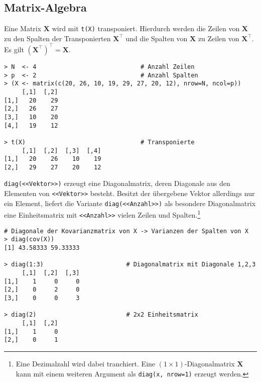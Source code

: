 \subsection{Matrix-Algebra}
\label{sec:matAlg}

Eine Matrix $\bm{X}$ wird mit \lstinline!t(X)! transponiert. Hierdurch werden die Zeilen von $\bm{X}$ zu den Spalten der Transponierten $\bm{X}^{\top}$ und die Spalten von $\bm{X}$ zu Zeilen von $\bm{X}^{\top}$. Es gilt $(\bm{X}^{\top})^{\top} = \bm{X}$.
\begin{lstlisting}
> N  <- 4                             # Anzahl Zeilen
> p  <- 2                             # Anzahl Spalten
> (X <- matrix(c(20, 26, 10, 19, 29, 27, 20, 12), nrow=N, ncol=p))
     [,1]  [,2]
[1,]   20    29
[2,]   26    27
[3,]   10    20
[4,]   19    12

> t(X)                                # Transponierte
     [,1]  [,2]  [,3]  [,4]
[1,]   20    26    10    19
[2,]   29    27    20    12
\end{lstlisting}

\lstinline!diag(<<Vektor>>)! erzeugt eine Diagonalmatrix, deren Diagonale aus den Elementen von \lstinline!<<Vektor>>! besteht. Besitzt der übergebene Vektor allerdings nur ein Element, liefert die Variante \lstinline!diag(<<Anzahl>>)! als besondere Diagonalmatrix eine Einheitsmatrix mit \lstinline!<<Anzahl>>! vielen Zeilen und Spalten.\footnote{Eine Dezimalzahl wird dabei tranchiert. Eine $(1 \times 1)$-Diagonalmatrix $\bm{X}$ kann mit einem weiteren Argument als \lstinline!diag(x, nrow=1)! erzeugt werden.}
\begin{lstlisting}
# Diagonale der Kovarianzmatrix von X -> Varianzen der Spalten von X
> diag(cov(X))
[1] 43.58333 59.33333

> diag(1:3)                       # Diagonalmatrix mit Diagonale 1,2,3
     [,1]  [,2]  [,3]
[1,]    1     0     0
[2,]    0     2     0
[3,]    0     0     3

> diag(2)                         # 2x2 Einheitsmatrix
     [,1]  [,2]
[1,]    1     0
[2,]    0     1
\end{lstlisting}

